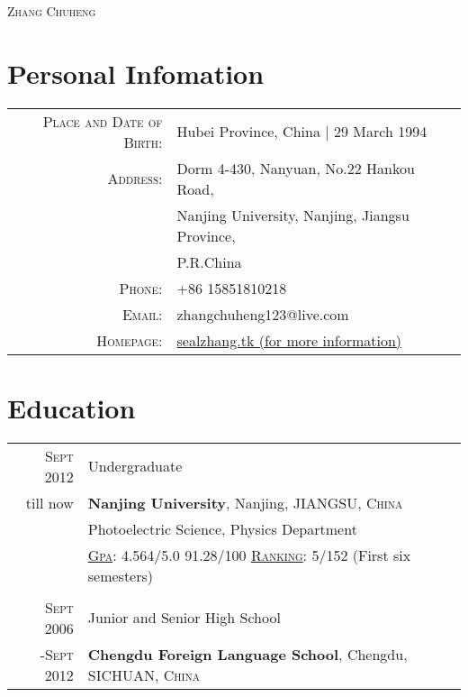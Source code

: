 \documentclass[ENG]{SealZhang}
\begin{document}
\par{\centering
		{%
		\Huge \textsc{Zhang Chuheng} }
		\bigskip\par}



\section{Personal Infomation}

\begin{tabular}{rl}
    \textsc{Place and Date of Birth:} & Hubei Province, China  | 29 March 1994 \\
    \textsc{Address:}   & Dorm 4-430, Nanyuan, No.22 Hankou Road, \\
                        & Nanjing University, Nanjing, Jiangsu Province, \\
                        & P.R.China \\
    \textsc{Phone:}     & +86 15851810218\\
    \textsc{Email:}     & zhangchuheng123@live.com \\
    \textsc{Homepage:}  & \href{http://sealzhang.tk}{sealzhang.tk (for more information)} 
\end{tabular}

\section{Education}
\begin{tabular}{rl}	
\textsc{Sept} 2012 & Undergraduate\\
till now & \textbf{Nanjing University}, Nanjing, JIANGSU, \textsc{China}\\
& Photoelectric Science, Physics Department \\
&\normalsize \textsc{\underline{Gpa}}: 4.564/5.0 91.28/100 \textsc{\underline{Ranking}}: 5/152 (First six semesters)\\
\\
\textsc{Sept} 2006 & Junior and Senior High School\\
-\textsc{Sept} 2012 & \textbf{Chengdu Foreign Language School}, Chengdu, SICHUAN, \textsc{China}\\

\end{tabular}

\end{document}
